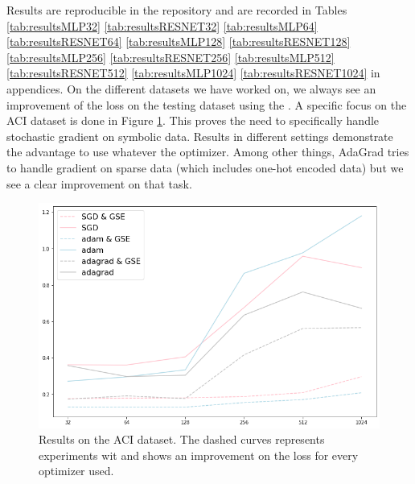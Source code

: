Results are reproducible in the repository and are recorded in Tables \ref{tab:resultsMLP32} \ref{tab:resultsRESNET32} \ref{tab:resultsMLP64} \ref{tab:resultsRESNET64} \ref{tab:resultsMLP128}  \ref{tab:resultsRESNET128} \ref{tab:resultsMLP256} \ref{tab:resultsRESNET256} \ref{tab:resultsMLP512} \ref{tab:resultsRESNET512} \ref{tab:resultsMLP1024}      \ref{tab:resultsRESNET1024} in appendices. On the different datasets we have worked on, we always see an improvement of the loss on the testing dataset using the \tecname. A specific focus on the ACI dataset is done in Figure \ref{fig:ACIresults}.
This proves the need to specifically handle stochastic gradient on symbolic data. Results in different settings demonstrate the advantage to use \tecname whatever the optimizer. Among other things, AdaGrad tries to handle gradient on sparse data (which includes one-hot encoded data) but we see a clear improvement on that task.



\begin{figure}[h!]
  \centering
  \includegraphics[width=0.7\linewidth]{figures/AdultIncomelossResults.png}
  \caption{Results on the ACI dataset. The dashed curves represents experiments wit \tecnameAbrv  and shows an improvement on the loss for every optimizer used.}
  \label{fig:ACIresults}
\end{figure}




